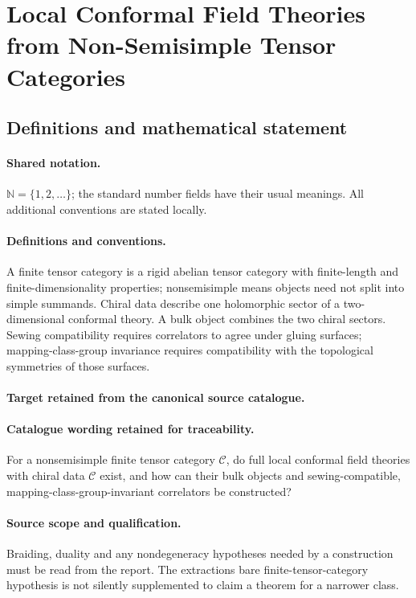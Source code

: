\documentclass[11pt]{article}
\begin{document}
\section{Local Conformal Field Theories from Non-Semisimple Tensor Categories}\label{statement}

\subsection{Definitions and mathematical statement}

\paragraph{Shared notation.}$\mathbb N=\{1,2,\ldots\}$; the standard number fields have their usual meanings. All additional conventions are stated locally.


\paragraph{Definitions and conventions.}
A finite tensor category is a rigid abelian tensor category with finite-length and finite-dimensionality properties; nonsemisimple means objects need not split into simple summands. Chiral data describe one holomorphic sector of a two-dimensional conformal theory. A bulk object combines the two chiral sectors. Sewing compatibility requires correlators to agree under gluing surfaces; mapping-class-group invariance requires compatibility with the topological symmetries of those surfaces.

\paragraph{Target retained from the canonical source catalogue.}
\paragraph{Catalogue wording retained for traceability.}
For a nonsemisimple finite tensor category $\mathcal C$, do full local conformal field theories with chiral data $\mathcal C$ exist, and how can their bulk objects and sewing-compatible, mapping-class-group-invariant correlators be constructed?

\paragraph{Source scope and qualification.}
Braiding, duality and any nondegeneracy hypotheses needed by a construction must be read from the report. The extraction\textquotesingle s bare finite-tensor-category hypothesis is not silently supplemented to claim a theorem for a narrower class.
\end{document}
